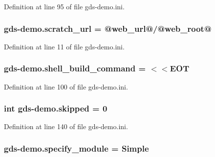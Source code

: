 Definition at line 95 of file gds-\/demo.\-ini.

\hypertarget{namespacegds-demo_a825b45a7f6cfdf6119a766e9938fbd38}{
\subsubsection[{scratch\-\_\-url}]{\setlength{\rightskip}{0pt plus 5cm}gds-\/demo.\-scratch\-\_\-url = @{\bf web\-\_\-url}@/@{\bf web\-\_\-root}@}}\label{namespacegds-demo_a825b45a7f6cfdf6119a766e9938fbd38}


Definition at line 11 of file gds-\/demo.\-ini.

\hypertarget{namespacegds-demo_a77a09eb94a2a16900f19882d658a9e7c}{
\subsubsection[{shell\-\_\-build\-\_\-command}]{\setlength{\rightskip}{0pt plus 5cm}gds-\/demo.\-shell\-\_\-build\-\_\-command = $<$$<$E\-O\-T}}\label{namespacegds-demo_a77a09eb94a2a16900f19882d658a9e7c}


Definition at line 100 of file gds-\/demo.\-ini.

\hypertarget{namespacegds-demo_a09c460047a7a72cd72b03a892e16804b}{
\subsubsection[{skipped}]{\setlength{\rightskip}{0pt plus 5cm}int gds-\/demo.\-skipped = 0}}\label{namespacegds-demo_a09c460047a7a72cd72b03a892e16804b}


Definition at line 140 of file gds-\/demo.\-ini.

\hypertarget{namespacegds-demo_a00e203a3795e52b29fff3a6502553b9c}{
\subsubsection[{specify\-\_\-module}]{\setlength{\rightskip}{0pt plus 5cm}gds-\/demo.\-specify\-\_\-module = Simple}}\label{namespacegds-demo_a00e203a3795e52b29fff3a6502553b9c}


